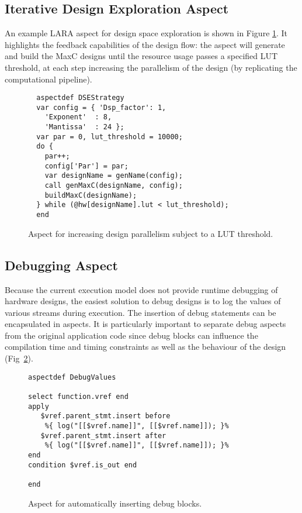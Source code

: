 \subsection{Iterative Design Exploration Aspect}

 An example LARA aspect for design space exploration is
shown in Figure \ref{fig:aspect-exploration}. It highlights the feedback capabilities of the design
flow: the aspect will generate and build the MaxC designs until the
resource usage passes a specified LUT threshold, at each step
increasing the parallelism of the design (by replicating the
computational pipeline).

\lstset{style=lara}
\begin{figure}[!h]
\begin{lstlisting}
  aspectdef DSEStrategy
  var config = { 'Dsp_factor': 1,
    'Exponent'  : 8,
    'Mantissa'  : 24 };
  var par = 0, lut_threshold = 10000;
  do {
    par++;
    config['Par'] = par;
    var designName = genName(config);
    call genMaxC(designName, config);
    buildMaxC(designName);
  } while (@hw[designName].lut < lut_threshold);
  end
\end{lstlisting}
\caption{Aspect for increasing design parallelism subject to a LUT
  threshold.}
\label{fig:aspect-exploration}
\end{figure}


\subsection{Debugging Aspect}

Because the current execution model does not provide runtime debugging
of hardware designs, the easiest solution to debug designs is to log
the values of various streams during execution. The insertion of debug
statements can be encapsulated in aspects. It is particularly
important to separate debug aspects from the original application code
since debug blocks can influence the compilation time and timing
constraints as well as the behaviour of the design (Fig~\ref{fig:aspect-debug}).

\lstset{style=lara}
\begin{figure}[!h]
  \centering
\begin{lstlisting}
aspectdef DebugValues

select function.vref end
apply
   $vref.parent_stmt.insert before
    %{ log("[[$vref.name]]", [[$vref.name]]); }%
   $vref.parent_stmt.insert after
    %{ log("[[$vref.name]]", [[$vref.name]]); }%
end
condition $vref.is_out end

end
\end{lstlisting}
  \caption{Aspect for automatically inserting debug blocks.}
  \label{fig:aspect-debug}
\end{figure}


